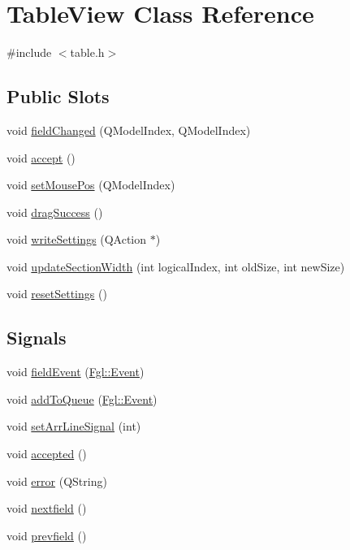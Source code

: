 \hypertarget{classTableView}{
\section{TableView Class Reference}
\label{classTableView}
}


{\ttfamily \#include $<$table.h$>$}

\subsection*{Public Slots}
\begin{DoxyCompactItemize}
\item 
void \hyperlink{classTableView_a4c5b64ca3ffb2289d6b9030942cfbfd5}{fieldChanged} (QModelIndex, QModelIndex)
\item 
void \hyperlink{classTableView_a4ae2229ec68bc96ada98844bc47434f5}{accept} ()
\item 
void \hyperlink{classTableView_ab31519c042431fa0e23f04b719156776}{setMousePos} (QModelIndex)
\item 
void \hyperlink{classTableView_ae24787bc253d6f181c13fc58bffd7ba2}{dragSuccess} ()
\item 
void \hyperlink{classTableView_a70c32ac02d45e8723f3521cf80f3862e}{writeSettings} (QAction $\ast$)
\item 
void \hyperlink{classTableView_a643a93fdbb136136598e30dc3b3ad5e4}{updateSectionWidth} (int logicalIndex, int oldSize, int newSize)
\item 
void \hyperlink{classTableView_af8a2f8a181aeb8d565fca8be2fe1437c}{resetSettings} ()
\end{DoxyCompactItemize}
\subsection*{Signals}
\begin{DoxyCompactItemize}
\item 
void \hyperlink{classTableView_aadaf88a599aa680ea0d6a3887ed8289d}{fieldEvent} (\hyperlink{structFgl_1_1Event}{Fgl::Event})
\item 
void \hyperlink{classTableView_a32078b555ceb891d3a9548d82cf7c689}{addToQueue} (\hyperlink{structFgl_1_1Event}{Fgl::Event})
\item 
void \hyperlink{classTableView_a5f99090ec924b96b7f2b026c47f580e6}{setArrLineSignal} (int)
\item 
void \hyperlink{classTableView_ad4f6aa906c014bed4437f67817e990e0}{accepted} ()
\item 
void \hyperlink{classTableView_a2ae0fadd583c6d25c0c8759d2b01ba6a}{error} (QString)
\item 
void \hyperlink{classTableView_a305e99f446bebdec5735d14281e06de9}{nextfield} ()
\item 
void \hyperlink{classTableView_a7648f39aa6fe83ae729c874f5437dba6}{prevfield} ()
\end{DoxyCompactItemize}
